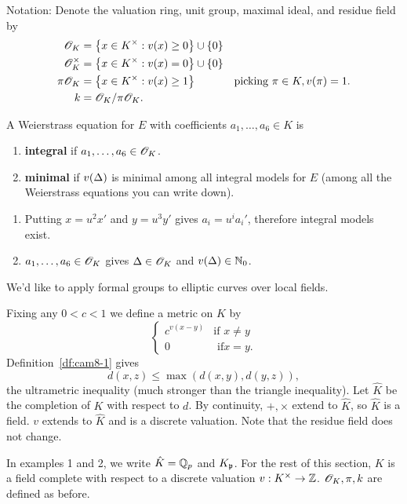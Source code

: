 Notation: Denote the valuation ring, unit group, maximal ideal, and residue field by 
\begin{align*}
\mathscr{O}_K&=\left\{{x\in K^{\times}}:{v(x)\ge 0}\right\}\cup \{0\}\\
\mathscr{O}_K^{\times}&=\left\{{x\in K^{\times}}:{v(x)=0}\right\}\cup \{0\}\\
\pi\mathscr{O}_K&=\left\{{x\in K^{\times}}:{v(x)\ge 1}\right\}&\text{picking }\pi\in K,v(\pi)=1.\\
k&=\mathscr{O}_K/\pi\mathscr{O}_K.
\end{align*}
\begin{df}
A Weierstrass equation for $E$ with coefficients $a_1,\ldots, a_6\in K$ is
\begin{enumerate}
\item
\textbf{integral} if $a_1,\ldots,a_6\in \mathscr{O}_K$.
\item
\textbf{minimal} if $v(\Delta)$ is minimal among all integral models for $E$ (among all the Weierstrass equations you can write down).
\end{enumerate}
\end{df}
\begin{rem}
\begin{enumerate}
\item
Putting $x=u^2x'$ and $y=u^3y'$ gives $a_i=u^ia_i'$, therefore integral models exist.
\item
$a_1,\ldots, a_6\in \mathscr{O}_K$ gives $\Delta\in \mathscr{O}_K$ and $v(\Delta)\in \mathbb{N}_0$.
\end{enumerate}
\end{rem}
We'd like to apply formal groups to elliptic curves over local fields.

Fixing any $0<c<1$ we define a metric on $K$ by
\[
\begin{cases}
c^{v(x-y)}&\text{if }x\ne y\\
0&\text{ if}x=y.
\end{cases}
\]
Definition~\ref{df:cam8-1} gives 
\[
d(x,z)\le \max(d(x,y),d(y,z)),
\]
the ultrametric inequality (much stronger than the triangle inequality). 
Let $\hat K$ be the completion of $K$ with respect to $d$. By continuity, $+,\times$ extend to $\hat K$, so $\hat K$ is a field. $v$ extends to $\hat K$ and is a discrete valuation. Note that the residue field does not change.

In examples 1 and 2, we write $\hat K=\mathbb{Q}_p$ and $K_{\mathfrak{p}}$. For the rest of this section, $K$ is a field complete with respect to a discrete valuation $v:K^{\times}\to \mathbb{Z}$. $\mathscr{O}_K,\pi,k$ are defined as before.

